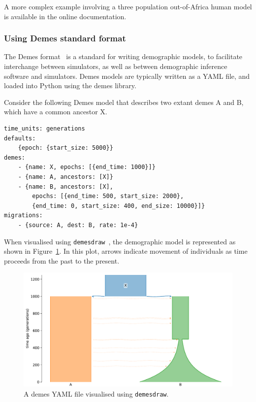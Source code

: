 \documentclass[graybox]{svmult}
\begin{document}
A more complex example involving a three population out-of-Africa human
model is available in the online documentation.

\subsubsection{Using Demes standard format}\label{using-demes-standard-format}

The Demes format~\citep{gower_demes_2022} is a standard for writing
demographic models, to facilitate interchange between simulators, as well as between
demographic inference software and simulators. Demes models are typically written as a
YAML file, and loaded into Python using the demes library.

Consider the following Demes model that describes two extant demes A and B, which
have a common ancestor X.

\begin{footnotesize}
\begin{verbatim}
time_units: generations
defaults:
    {epoch: {start_size: 5000}}
demes:
    - {name: X, epochs: [{end_time: 1000}]}
    - {name: A, ancestors: [X]}
    - {name: B, ancestors: [X],
        epochs: [{end_time: 500, start_size: 2000},
        {end_time: 0, start_size: 400, end_size: 10000}]}
migrations:
    - {source: A, dest: B, rate: 1e-4}

\end{verbatim}
\end{footnotesize}

When visualised using \texttt{demesdraw}~\citep{gower_grahamgowerdemesdraw_2024},
the demographic model is represented as shown in Figure~\ref{fig-demes-plot}.
 In this plot, arrows indicate movement of individuals as time proceeds from
the past to the present.

\begin{figure}[t]
\centering
\includegraphics[width=\textwidth]{images/demes.pdf}
\caption{\label{fig-demes-plot}A demes YAML file visualised using \texttt{demesdraw}.}
\end{figure}
\end{document}
